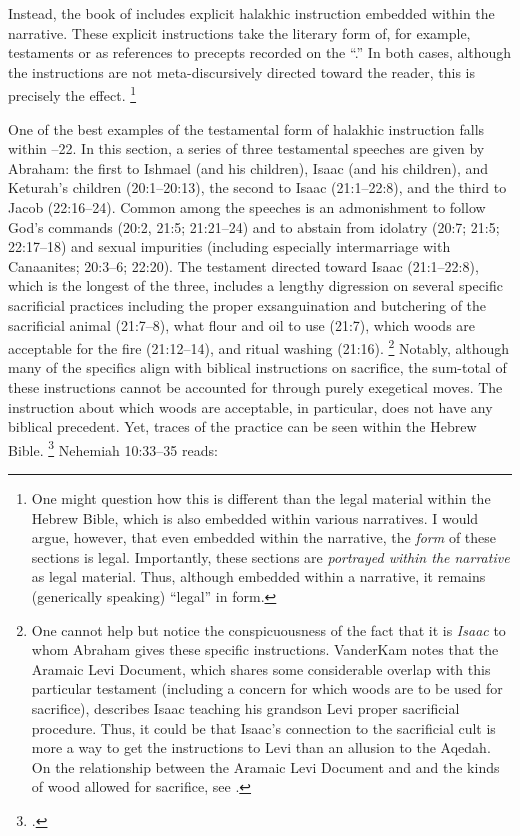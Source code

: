 Instead, the book of \jub includes explicit halakhic instruction embedded within the narrative. These explicit instructions take the literary form of, for example, testaments or as references to precepts recorded on the ``\heavenlytablets.'' In both cases, although the instructions are not meta-discursively directed toward the reader, this is precisely the effect.%
    \footnote{One might question how this is different than the legal material within the Hebrew Bible, which is also embedded within various narratives. I would argue, however, that even embedded within the narrative, the \emph{form} of these sections is legal. Importantly, these sections are \emph{portrayed within the narrative} as legal material. Thus, although embedded within a narrative, it remains (generically speaking) ``legal'' in form.}

One of the best examples of the testamental form of halakhic instruction falls within --22. In this section, a series of three testamental speeches are given by Abraham: the first to Ishmael (and his children), Isaac (and his children), and Keturah's children (20:1--20:13), the second to Isaac (21:1--22:8), and the third to Jacob (22:16--24). Common among the speeches is an admonishment to follow God's commands (20:2, 21:5; 21:21--24) and to abstain from idolatry (20:7; 21:5; 22:17--18) and sexual impurities (including especially intermarriage with Canaanites; 20:3--6; 22:20). The testament directed toward Isaac (21:1--22:8), which is the longest of the three, includes a lengthy digression on several specific sacrificial practices including the proper exsanguination and butchering of the sacrificial animal (21:7--8), what flour and oil to use (21:7), which woods are acceptable for the fire (21:12--14), and ritual washing (21:16).%
    \footnote{One cannot help but notice the conspicuousness of the fact that it is \emph{Isaac} to whom Abraham gives these specific instructions. VanderKam notes that the Aramaic Levi Document, which shares some considerable overlap with this particular testament (including a concern for which woods are to be used for sacrifice), describes Isaac teaching his grandson Levi proper sacrificial procedure. Thus, it could be that Isaac's connection to the sacrificial cult is more a way to get the instructions to Levi than an allusion to the Aqedah. On the relationship between the Aramaic Levi Document and \jub and the kinds of wood allowed for sacrifice, see \cite[625, 636--639]{vanderkam2018}.}
Notably, although many of the specifics align with biblical instructions on sacrifice, the sum-total of these instructions cannot be accounted for through purely exegetical moves. The instruction about which woods are acceptable, in particular, does not have any biblical precedent. Yet, traces of the practice can be seen within the Hebrew Bible.%
    \footnote{\Cite[]{vanderkam2018}.}
Nehemiah 10:33--35 reads:

